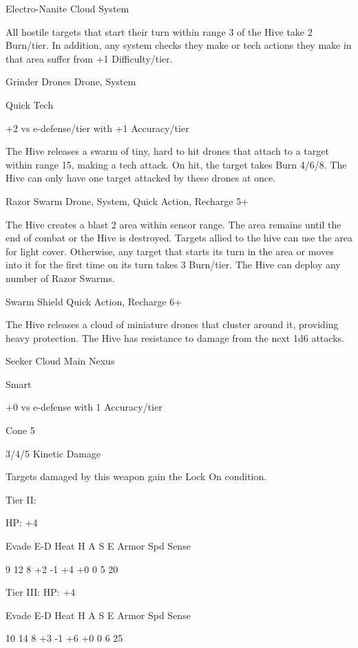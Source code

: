 Electro-Nanite Cloud
System





All hostile targets that start their turn within range 3 of the Hive take 2 Burn/tier. In addition, any
system checks they make or tech actions they make in that area suffer from +1 Difficulty/tier.


Grinder Drones
Drone, System

Quick Tech

+2 vs e-defense/tier with +1 Accuracy/tier

The Hive releases a swarm of tiny, hard to hit drones that attach to a target within range 15,
making a tech attack. On hit, the target takes Burn 4/6/8. The Hive can only have one target
attacked by these drones at once.


Razor Swarm
Drone, System, Quick Action, Recharge 5+

The Hive creates a blast 2 area within sensor range. The area remains until the end of combat or
the Hive is destroyed. Targets allied to the hive can use the area for light cover. Otherwise, any
target that starts its turn in the area or moves into it for the first time on its turn takes 3 Burn/tier.
The Hive can deploy any number of Razor Swarms.


Swarm Shield
Quick Action, Recharge 6+

The Hive releases a cloud of miniature drones that cluster around it, providing heavy protection.
The Hive has resistance to damage from the next 1d6 attacks.


Seeker Cloud
Main Nexus

Smart

+0 vs e-defense with 1 Accuracy/tier

Cone 5

3/4/5 Kinetic Damage

Targets damaged by this weapon gain the Lock On condition.


Tier II:

HP: +4


          Evade    E-D    Heat    H    A     S    E       Armor        Spd      Sense

         9         12     8       +2   -1    +4   +0       0           5        20

Tier III:
HP: +4


          Evade    E-D    Heat    H    A     S    E       Armor        Spd      Sense

          10       14     8       +3   -1    +6   +0       0           6        25
